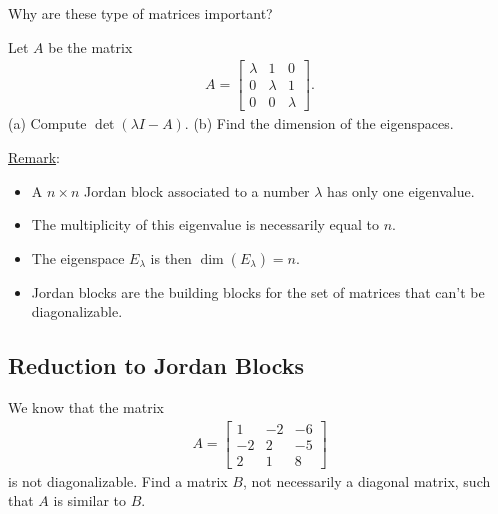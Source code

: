 \documentclass[12pt,a4paper]{article}
\newcounter{example}[section]
\begin{document}
	Why are these type of matrices important?
		
	\begin{example}
	Let $A$ be the matrix
		\begin{align*}
		A = \begin{bmatrix}
		\lambda & 1 & 0 \\
		0 & \lambda & 1 \\
		0 & 0 & \lambda
		\end{bmatrix}.
		\end{align*}
	(a) Compute $\det (\lambda I - A)$. (b) Find the dimension of the eigenspaces.
	\end{example}
	
	\vfill
	
	\underline{Remark}: 
	\begin{itemize}
	\item A $n \times n$ Jordan block associated to a number $\lambda$ has only one eigenvalue.
	\item The multiplicity of this eigenvalue is necessarily equal to $n$.
	\item The eigenspace $E_{\lambda}$ is then $\dim (E_{\lambda}) = n$.
	\item Jordan blocks are the building blocks for the set of matrices that can't be diagonalizable.
	\end{itemize}
	
	\newpage
	
	\subsection{Reduction to Jordan Blocks}
	
	\begin{example}
	We know that the matrix
		\begin{align*}
		A = \begin{bmatrix}
		1 & -2 & -6 \\ -2 & 2 & -5 \\ 2 & 1 & 8
		\end{bmatrix}
		\end{align*}
	is not diagonalizable. Find a matrix $B$, not necessarily a diagonal matrix, such that $A$ is similar to $B$.
	\end{example}
	
	\newpage
	
\end{document}
